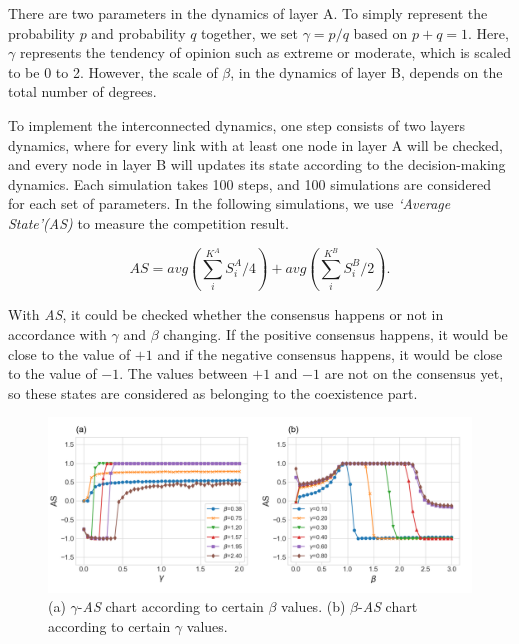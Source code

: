 \documentclass[english]{cccconf}
\begin{document}
There are two parameters in the dynamics of layer A. To simply represent the probability $p$ and probability $q$ together, we set $\gamma = p/q$ based on $p+q=1$. Here, $\gamma$ represents the tendency of opinion such as extreme or moderate, which is scaled to be 0 to 2. However, the scale of $\beta$, in the dynamics of layer B, depends on the total number of degrees. 

To implement the interconnected dynamics, one step consists of two layers dynamics, where for every link with at least one node in layer A will be checked, and every node in layer B will updates its state according to the decision-making dynamics. Each simulation takes 100 steps, and 100 simulations are considered  for each set of parameters. In the following simulations, we use \textit{`Average State'(AS)} to measure the competition result.

\begin{equation}
AS = avg\left( {\sum\limits_i^{{K^A}} {S_i^A/4} } \right) + avg\left( {\sum\limits_i^{{K^B}} {S_i^B/2} } \right).
\end{equation}

With \textit{AS}, it could be checked whether the consensus happens or not in accordance with $\gamma$ and $\beta$ changing.  If the positive consensus happens, it would be close to the value of $+1$ and if the negative consensus happens, it would be close to the value of $-1$. The values between $+1$ and $-1$ are not on the consensus yet, so these states are considered as belonging to the coexistence part.

\begin{figure}[!htb]
	\centering
	\includegraphics[width=\hsize]{FIG2.png}
	\caption{(a) $\gamma$-\textit{AS} chart according to certain $\beta$ values. (b) $\beta$-\textit{AS} chart according to certain $\gamma$ values.}
	\label{Fig2}
\end{figure}
\end{document}
